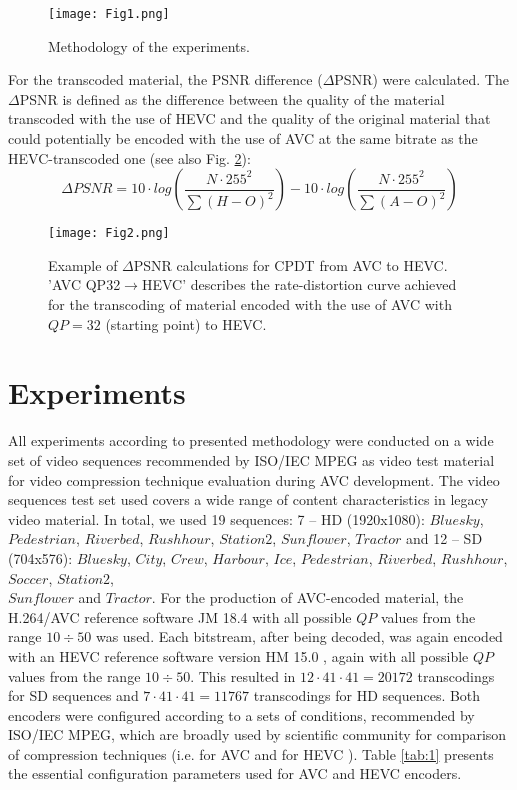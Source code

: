 \documentclass[twocolumn]{svjour3}          %
\begin{document}
\begin{figure}
\texttt{[image: Fig1.png]}
\caption{Methodology of the experiments.}
\label{fig:1}       %
\end{figure}

For the transcoded material, the PSNR difference ($\Delta$PSNR) were calculated. The $\Delta$PSNR is defined as the difference between the quality of the material transcoded with the use of HEVC and the quality of the original material that could potentially be encoded with the use of AVC at the same bitrate as the HEVC-transcoded one (see also Fig. \ref{fig:2}):
\begin{equation}
\Delta PSNR= 10\cdot log(\frac{N\cdot 255^{2}}{\sum (H-O)^{2}})-10\cdot log(\frac{N\cdot 255^{2}}{\sum (A-O)^{2}})
\end{equation}

\begin{figure}
\texttt{[image: Fig2.png]}
\caption{Example of $\Delta$PSNR calculations for CPDT from AVC to HEVC. 'AVC QP32$\rightarrow$HEVC' describes the rate-distortion curve achieved for the transcoding of  material encoded with the use of AVC with $QP=32$ (starting point) to HEVC.}
\label{fig:2}       %
\end{figure}

\section{Experiments}
\label{sec:2}
All experiments according to presented methodology were conducted on a wide set of video sequences recommended by ISO/IEC MPEG as video test material for video compression technique evaluation during AVC development. The video sequences test set used covers a wide range of content characteristics in legacy video material. In total, we used 19 sequences: 7 -- HD (1920x1080): $Bluesky$, $Pedestrian$, $Riverbed$, $Rushhour$, $Station2$, $Sunflower$, $Tractor$ and 12 -- SD (704x576): $Bluesky$, $City$, $Crew$, $Harbour$, $Ice$, $Pedestrian$, $Riverbed$, $Rushhour$, $Soccer$, $Station2$, \\$Sunflower$ and $Tractor$. For the production of AVC-encoded material, the H.264/AVC reference software JM 18.4 \cite{Ref:14} with all possible $QP$ values from the range $10\div50$ was used. Each bitstream, after being decoded, was again encoded with an HEVC reference software version HM 15.0 \cite{Ref:15}, again with all possible $QP$ values from the range $10\div50$. This resulted in $12\cdot41\cdot41=20172$ transcodings for SD sequences and $7\cdot41\cdot41=11767$ transcodings for HD sequences. Both encoders were configured according to a sets of conditions, recommended by ISO/IEC MPEG, which are broadly used by scientific community for comparison of compression techniques (i.e. for AVC \cite{Ref:16} and for HEVC \cite{Ref:17}). Table \ref{tab:1} presents the essential configuration parameters used for AVC and HEVC encoders.
\end{document}
